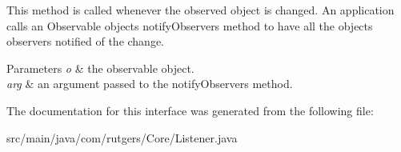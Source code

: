 This method is called whenever the observed object is changed. An application calls an {\ttfamily Observable} object\textquotesingle{}s {\ttfamily notify\+Observers} method to have all the object\textquotesingle{}s observers notified of the change.


\begin{DoxyParams}{Parameters}
{\em o} & the observable object. \\
\hline
{\em arg} & an argument passed to the {\ttfamily notify\+Observers} method. \\
\hline
\end{DoxyParams}


The documentation for this interface was generated from the following file\+:\begin{DoxyCompactItemize}
\item 
src/main/java/com/rutgers/\+Core/Listener.\+java\end{DoxyCompactItemize}
